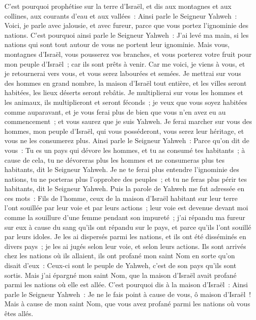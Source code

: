 \begin{multicols}{2}
C'est pourquoi prophétise sur la terre d'Israël, et dis aux montagnes et aux collines, aux courants d'eau et aux vallées~: Ainsi parle le Seigneur Yahweh~: Voici, je parle avec jalousie, et avec fureur, parce que vous portez l'ignominie des nations.
C'est pourquoi ainsi parle le Seigneur Yahweh~: J'ai levé ma main, si les nations qui sont tout autour de vous ne portent leur ignominie.
Mais vous, montagnes d'Israël, vous pousserez vos branches, et vous porterez votre fruit pour mon peuple d'Israël~; car ils sont prêts à venir.
Car me voici, je viens à vous, et je retournerai vers vous, et vous serez labourées et semées.
Je mettrai sur vous des hommes en grand nombre, la maison d'Israël tout entière, et les villes seront habitées, les lieux déserts seront rebâtis.
Je multiplierai sur vous les hommes et les animaux, ils multiplieront et seront féconds~; je veux que vous soyez habitées comme auparavant, et je vous ferai plus de bien que vous n'en avez eu au commencement~; et vous saurez que je suis Yahweh.
Je ferai marcher sur vous des hommes, mon peuple d'Israël, qui vous posséderont, vous serez leur héritage, et vous ne les consumerez plus.
Ainsi parle le Seigneur Yahweh~: Parce qu'on dit de vous~: Tu es un pays qui dévore les hommes, et tu as consumé tes habitants~;
à cause de cela, tu ne dévoreras plus les hommes et ne consumeras plus tes habitants, dit le Seigneur Yahweh.
Je ne te ferai plus entendre l'ignominie des nations, tu ne porteras plus l'opprobre des peuples~; et tu ne feras plus périr tes habitants, dit le Seigneur Yahweh.
Puis la parole de Yahweh me fut adressée en ces mots~:
Fils de l'homme, ceux de la maison d'Israël habitant sur leur terre l'ont souillée par leur voie et par leurs actions~; leur voie est devenue devant moi comme la souillure d'une femme pendant son impureté~;
j'ai répandu ma fureur sur eux à cause du sang qu'ils ont répandu sur le pays, et parce qu'ils l'ont souillé par leurs idoles.
Je les ai dispersés parmi les nations, et ils ont été disséminés en divers pays~; je les ai jugés selon leur voie, et selon leurs actions.
Ils sont arrivés chez les nations où ils allaient, ils ont profané mon saint Nom en sorte qu'on disait d'eux~: Ceux-ci sont le peuple de Yahweh, c'est de son pays qu'ils sont sortis.
Mais j'ai épargné mon saint Nom, que la maison d'Israël avait profané parmi les nations où elle est allée.
C'est pourquoi dis à la maison d'Israël~: Ainsi parle le Seigneur Yahweh~: Je ne le fais point à cause de vous, ô maison d'Israël~! Mais à cause de mon saint Nom, que vous avez profané parmi les nations où vous êtes allés.

\end{multicols}

